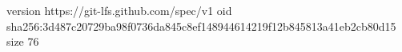 version https://git-lfs.github.com/spec/v1
oid sha256:3d487c20729ba98f0736da845c8ef148944614219f12b845813a41eb2cb80d15
size 76
